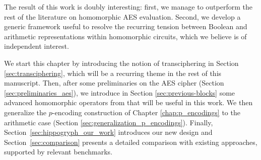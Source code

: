 The result of this work is doubly interesting: first, we manage to outperform the rest of the literature on homomorphic AES evaluation. Second, we develop a generic framework useful to resolve the recurring tension between Boolean and arithmetic representations within homomorphic circuits, which we believe is of independent interest.


We start this chapter by introducing the notion of transciphering in Section \ref{sec:transciphering}, which will be a recurring theme in the rest of this manuscript. Then, after some preliminaries on the AES cipher (Section \ref{sec:preliminaries_aes}), we introduce in Section \ref{sec:previous-blocks} some advanced homomorphic operators from \cite{DBLP:conf/wahc/TramaCBS23} that will be useful in this work. We then generalize the $p$-encoding construction of Chapter \ref{chap:p_encodings} to the arithmetic case (Section \ref{sec:generalization_p_encodings}). Finally, Section~\ref{sec:hippogryph_our_work} introduces our new design and Section~\ref{sec:comparison} presents a detailed comparison with existing approaches, supported by relevant benchmarks.




